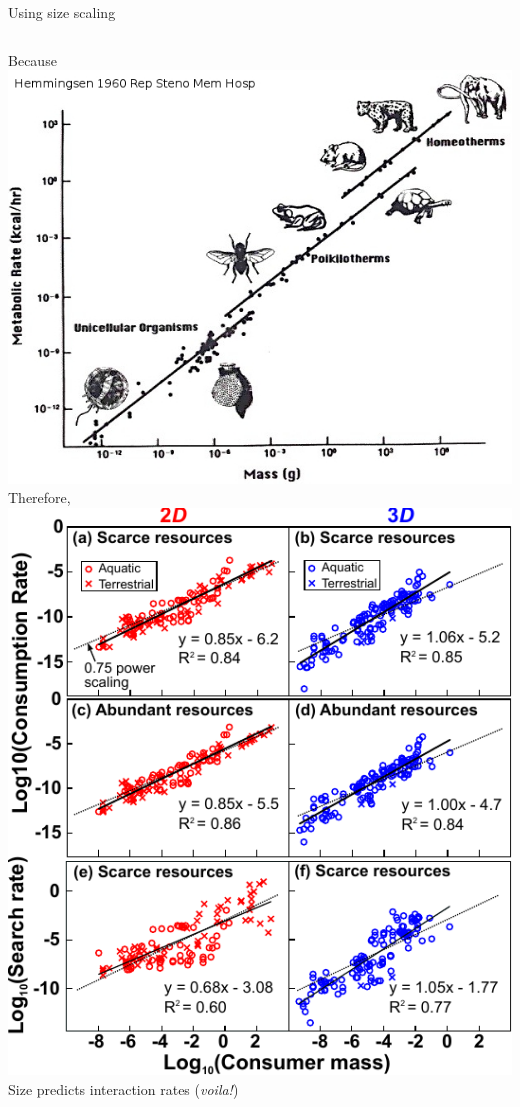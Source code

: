 \documentclass[xcolor={usenames,x11names},compress]{beamer}
\renewcommand{\(}{\begin{columns}}
\renewcommand{\)}{\end{columns}}
\newcommand{\<}[1]{\begin{column}{#1}}
\renewcommand{\>}{\end{column}}
\begin{document}
\begin{frame}{Using size scaling}

  \begin{columns}[c]
    \centering
    Because
    \vspace{10pt}\\
    \includegraphics[width=\textwidth]{MetabScaling.jpg} 
    \centering
    \pause
    Therefore,\\ \pause
    \includegraphics[width=.9\textwidth]{graphics/DimRes1.pdf}
    Size predicts interaction rates ({\it voila!})
  \end{columns}

\end{frame}
\end{document}
